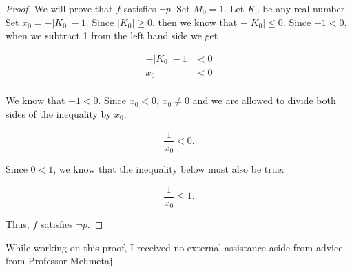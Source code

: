 \documentclass[12pt]{article}
\begin{document}
\begin{proof}
    
    We will prove that $f$ satisfies $\lnot p.$ Set $M_0 = 1$. Let $K_0$ be any real number. Set $x_0 = -|K_0| - 1$. Since $|K_0| \geq 0$, then we know that $-|K_0| \leq 0$. Since $-1 < 0$, when we subtract 1 from the left hand side we get

    \begin{align*}
        -|K_0| - 1 & < 0 \\
        x_0 & < 0 \\
    \end{align*}
    
    We know that $-1 < 0$. Since $x_0 < 0$, $x_0 \neq 0$ and we are allowed to divide both sides of the inequality by $x_0$.

    $$\frac{1}{x_0} < 0.$$

    Since $0 < 1$, we know that the inequality below must also be true:

    $$\frac{1}{x_0} \leq 1.$$

    Thus, $f$ satisfies $\lnot p$.

\end{proof}


\noindent While working on this proof, I received no external assistance aside from advice from Professor Mehmetaj.
\end{document}
